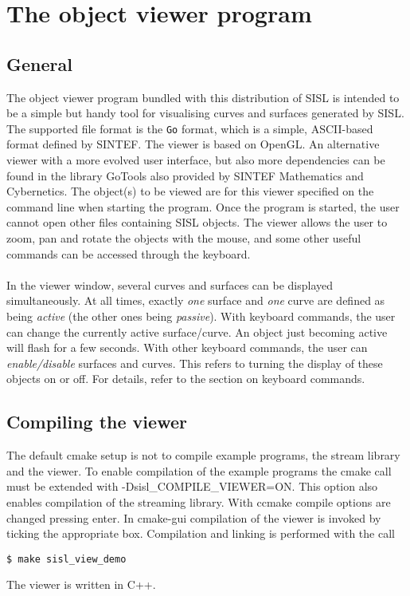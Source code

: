 \chapter{The object viewer program}

\section{General}
The object viewer program bundled with this distribution of SISL is intended to be
a simple but handy tool for visualising curves and surfaces generated by SISL.  The
supported file format is the \verb/Go/ format, 
which is a simple, ASCII-based format defined by SINTEF.  The viewer is based on OpenGL.
An alternative viewer with a more evolved user interface, but also more dependencies can
be found in the library GoTools also provided by SINTEF Mathematics and Cybernetics.
The object(s) to be viewed are for this viewer specified on the command line when starting the 
program.  Once the program is started, the user cannot open other files containing
SISL objects.  The viewer allows the user to zoom, pan and rotate the objects with
the mouse, and some other useful commands can be accessed through the keyboard.
\\
\\
In the viewer window, several curves and surfaces can be displayed simultaneously.
At all times, exactly \emph{one} surface and \emph{one} curve are defined as being
\emph{active} (the other ones being \emph{passive}).  With keyboard commands, the user
can change the currently active surface/curve.  An object just becoming active will
flash for a few seconds.  With other keyboard commands, the user can \emph{enable/disable}
surfaces and curves.  This refers to turning the display of these objects on or off.
For details, refer to the section on keyboard commands.

\section{Compiling the viewer}
The default cmake setup is not to compile example programs, the stream library and the viewer.
To enable compilation of the example programs the cmake call must be extended with
-Dsisl\_COMPILE\_VIEWER=ON. This option also enables compilation of the streaming library.
With ccmake compile options are changed pressing enter. In cmake-gui compilation of the viewer
is invoked by ticking the appropriate box.
Compilation and linking is performed with the call
\begin{verbatim}
$ make sisl_view_demo
\end{verbatim}
The viewer is written in C++.

